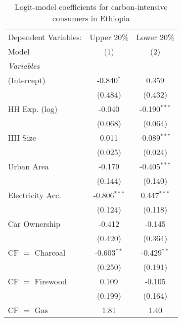 
\begin{table}[htbp!]
   \centering
   \small
   \begin{adjustbox}{width = 1\textwidth, max height = 0.95\textheight, center}
      \begin{threeparttable}[b]
         \caption{\label{tab:Logit_1_ETH} Logit-model coefficients for carbon-intensive consumers in Ethiopia}
         \begin{tabular}{lcc}
            \tabularnewline \midrule \midrule
            Dependent Variables: & Upper 20\%     & Lower 20\%\\   
            Model                & (1)            & (2)\\  
            \midrule
            \emph{Variables}\\
            (Intercept)          & -0.840$^{*}$   & 0.359\\   
                                 & (0.484)        & (0.432)\\   
            HH Exp. (log)        & -0.040         & -0.190$^{***}$\\   
                                 & (0.068)        & (0.064)\\   
            HH Size              & 0.011          & -0.089$^{***}$\\   
                                 & (0.025)        & (0.024)\\   
            Urban Area           & -0.179         & -0.405$^{***}$\\   
                                 & (0.144)        & (0.140)\\   
            Electricity Acc.     & -0.806$^{***}$ & 0.447$^{***}$\\   
                                 & (0.124)        & (0.118)\\   
            Car Ownership        & -0.412         & -0.145\\   
                                 & (0.420)        & (0.364)\\   
            CF $=$ Charcoal      & -0.603$^{**}$  & -0.429$^{**}$\\   
                                 & (0.250)        & (0.191)\\   
            CF $=$ Firewood      & 0.109          & -0.105\\   
                                 & (0.199)        & (0.164)\\   
            CF $=$ Gas           & 1.81           & 1.40\\   

\end{tabular}
\end{threeparttable}
\end{adjustbox}
\end{table}
